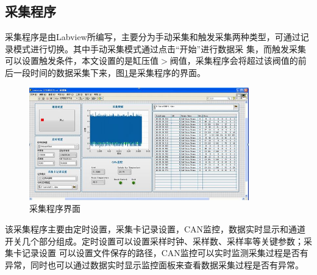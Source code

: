 \subsection{采集程序}
采集程序是由Labview所编写，主要分为手动采集和触发采集两种类型，可通过记录模式进行切换。其中手动采集模式通过点击“开始”进行数据采
集，而触发采集可以设置触发条件，本文设置的是缸压值$>$阀值，采集程序会将超过该阀值的前后一段时间的数据采集下来，图\ref{fig:cjcxjm}是采集程序的界面。
\begin{figure}[htb]
	\centering
	\includegraphics[width=0.85\textwidth,trim=0.25cm 0.5cm 4.5cm 1.25cm,clip]{thesis_figure/platformer_chapter/cjcxjm}
	\caption{采集程序界面}
	\label{fig:cjcxjm}
\end{figure}
\par 该采集程序主要由定时设置，采集卡记录设置，CAN监控，数据实时显示和通道开关几个部分组成。定时设置可以设置采样时钟、采样数、采样率等关键参数；采集卡记录设置
可以设置文件保存的路径，CAN监控可以实时监测采集过程是否有异常，同时也可以通过数据实时显示监控面板来查看数据采集过程是否有异常。





